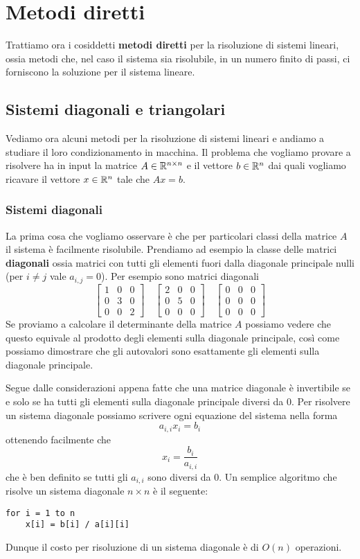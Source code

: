 \chapter{Metodi diretti}
Trattiamo ora i cosiddetti \textbf{metodi diretti} per la risoluzione di sistemi lineari, ossia metodi che,
nel caso il sistema sia risolubile, in un numero finito di passi, ci forniscono la soluzione per il sistema
lineare.

\section{Sistemi diagonali e triangolari}
Vediamo ora alcuni metodi per la risoluzione di sistemi lineari e andiamo a studiare il loro condizionamento
in macchina. Il problema che vogliamo provare a risolvere ha in input la matrice $A \in \mathbb{R}^{n \times n}$ e il
vettore $b \in \mathbb{R}^n$ dai quali vogliamo ricavare il vettore $x \in \mathbb{R}^n$ tale che $A x = b$.

\subsection{Sistemi diagonali}
La prima cosa che vogliamo osservare è che per particolari classi della matrice $A$ il sistema è facilmente
risolubile. Prendiamo ad esempio la classe delle matrici \textbf{diagonali} ossia matrici con tutti gli elementi
fuori dalla diagonale principale nulli (per $i \neq j$ vale $a_{i,j} = 0$). Per esempio sono matrici diagonali
\[
	\begin{bmatrix}
		1 & 0 & 0 \\
		0 & 3 & 0 \\
		0 & 0 & 2
	\end{bmatrix} \quad
	\begin{bmatrix}
		2 & 0 & 0 \\
		0 & 5 & 0 \\
		0 & 0 & 0
	\end{bmatrix} \quad
	\begin{bmatrix}
		0 & 0 & 0 \\
		0 & 0 & 0 \\
		0 & 0 & 0
	\end{bmatrix}
\]
Se proviamo a calcolare il determinante della matrice $A$ possiamo vedere che questo equivale al prodotto degli
elementi sulla diagonale principale, così come possiamo dimostrare che gli autovalori sono esattamente gli
elementi sulla diagonale principale.

Segue dalle considerazioni appena fatte che una matrice diagonale è invertibile se e solo se ha tutti gli elementi
sulla diagonale principale diversi da 0. Per risolvere un sistema diagonale possiamo scrivere ogni equazione del
sistema nella forma
\[ a_{i,i} x_i = b_i \]
ottenendo facilmente che
\[ x_i = \frac{b_i}{a_{i,i}} \]
che è ben definito se tutti gli $a_{i,i}$ sono diversi da 0. Un semplice algoritmo che risolve un sistema diagonale
$n \times n$ è il seguente:
\begin{lstlisting}[language=pseudo, style=pseudo-style]
for i = 1 to n
	x[i] = b[i] / a[i][i]
\end{lstlisting}
Dunque il costo per risoluzione di un sistema diagonale è di $O(n)$ operazioni.

